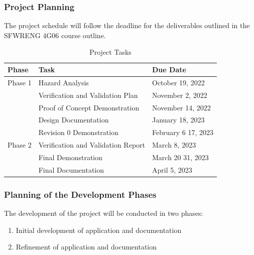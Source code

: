 \documentclass[12pt]{article}
\begin{document}
\subsubsection{Project Planning}
The project schedule will follow the deadline for the deliverables outlined in the SFWRENG 4G06
course outline.

\begin{table}[H]
	\centering
	\caption{Project Tasks}
	\vspace{5pt}
	\begin{tabular}{|p{}|p{}|p{}|}
		\hline
		\textbf{Phase} & \textbf{Task}                      & \textbf{Due Date}                 \\
		\hline
		Phase 1        & Hazard Analysis                    & October 19, 2022                  \\
		\cline{2-3}    & Verification and Validation Plan   & November 2, 2022                  \\
		\cline{2-3}    & Proof of Concept Demonstration     & November 14, 2022                 \\
		\cline{2-3}    & Design Documentation               & January 18, 2023                  \\
		\cline{2-3}    & Revision 0 Demonstration           & February 6 \textemdash{} 17, 2023 \\
		\hline
		Phase 2        & Verification and Validation Report & March 8, 2023                     \\
		\cline{2-3}    & Final Demonstration                & March 20 \textemdash{} 31, 2023   \\
		\cline{2-3}    & Final Documentation                & April 5, 2023                     \\
		\hline
	\end{tabular}

	\label{project_tasks}
\end{table}

\subsubsection{Planning of the Development Phases}

The development of the project will be conducted in two phases:

\begin{enumerate}
	\item Initial development of application and documentation
	\item Refinement of application and documentation
\end{enumerate}
\end{document}
